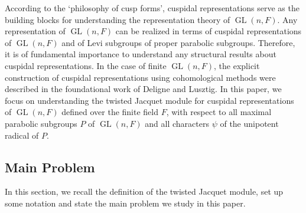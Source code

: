 \documentclass[reqno]{amsart}
\theoremstyle{definition}
\theoremstyle{remark}
\numberwithin{equation}{section}
\DeclareMathOperator{\GL}{GL}
\begin{document}
According to the `philosophy of cusp forms', cuspidal representations serve as the building blocks for understanding the representation theory of $\GL(n,F)$. Any representation of $\GL(n,F)$ can be realized in terms of cuspidal representations of $\GL(n,F)$ and of Levi subgroups of proper parabolic subgroups. Therefore, it is of fundamental importance to understand any structural results about cuspidal representations. In the case of finite $\GL(n,F)$, the explicit construction of cuspidal representations using cohomological methods were described in the foundational work of Deligne and Lusztig. In this paper, we focus on understanding the twisted Jacquet module for cuspidal representations of $\GL(n,F)$ defined over the finite field $F$, with respect to all maximal parabolic subgroups $P$ of $\GL(n,F)$ and all characters $\psi$ of the unipotent radical of $P$. \\




\subsection{Main Problem} In this section, we recall the definition of the twisted Jacquet module, set up some notation and state the main problem we study in this paper. \\
\end{document}

